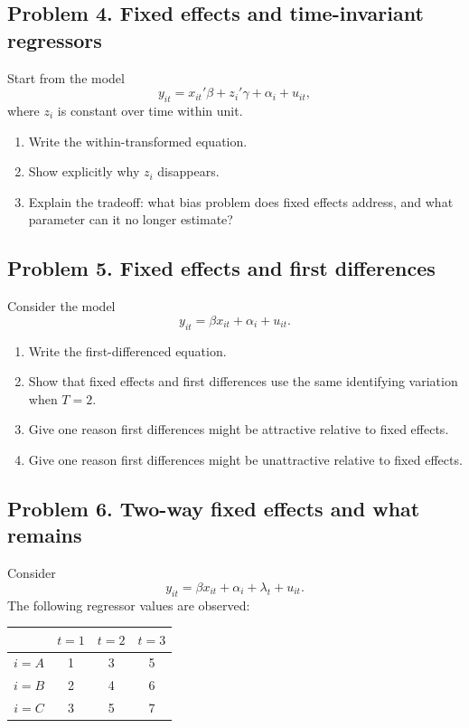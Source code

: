 \documentclass[11pt]{article}
\begin{document}
\subsection*{Problem 4. Fixed effects and time-invariant regressors}

Start from the model
\[
y_{it}=x_{it}'\beta+z_i'\gamma+\alpha_i+u_{it},
\]
where $z_i$ is constant over time within unit.

\begin{enumerate}[label=(\alph*)]
\item Write the within-transformed equation.
\item Show explicitly why $z_i$ disappears.
\item Explain the tradeoff: what bias problem does fixed effects address, and what parameter can it no longer estimate?
\end{enumerate}

\subsection*{Problem 5. Fixed effects and first differences}

Consider the model
\[
y_{it}=\beta x_{it}+\alpha_i+u_{it}.
\]

\begin{enumerate}[label=(\alph*)]
\item Write the first-differenced equation.
\item Show that fixed effects and first differences use the same identifying variation when $T=2$.
\item Give one reason first differences might be attractive relative to fixed effects.
\item Give one reason first differences might be unattractive relative to fixed effects.
\end{enumerate}

\subsection*{Problem 6. Two-way fixed effects and what remains}

Consider
\[
y_{it}=\beta x_{it}+\alpha_i+\lambda_t+u_{it}.
\]
The following regressor values are observed:

\begin{center}
\begin{tabular}{cccc}
\toprule
 & $t=1$ & $t=2$ & $t=3$ \\
\midrule
$i=A$ & 1 & 3 & 5 \\
$i=B$ & 2 & 4 & 6 \\
$i=C$ & 3 & 5 & 7 \\
\bottomrule
\end{tabular}
\end{center}
\end{document}
